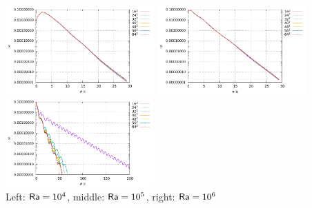 \begin{center}
\includegraphics[width=5.7cm]{python_codes/fieldstone_110/results_EBA/conv_Ra1e4.pdf}
\includegraphics[width=5.7cm]{python_codes/fieldstone_110/results_EBA/conv_Ra1e5.pdf}
\includegraphics[width=5.7cm]{python_codes/fieldstone_110/results_EBA/conv_Ra1e6.pdf}\\
{\captionfont Left: ${\mathsf{Ra}}=10^4$, middle: ${\mathsf{Ra}}=10^5$, right: ${\mathsf{Ra}}=10^6$} 
\end{center}

